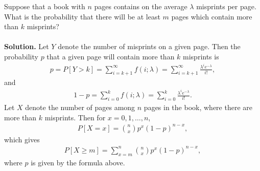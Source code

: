 Suppose that a book with $n$ pages contains on the average $\lambda$ misprints per page. What is the probability that there will be at least $m$ pages which contain more than $k$ misprints? \\
~\\
\textbf{Solution.} Let $Y$ denote the number of misprints on a given page. Then the probability $p$ that a given page will contain more than $k$ misprints is
\begin{align*}
p = P[Y > k] = \sum_{i=k+1}^{\infty} f(i; \lambda) = \sum_{i=k+1}^{\infty} \frac{\lambda^i e^{-\lambda}}{i!},
\end{align*}
and
\begin{align*}
1 - p = \sum_{i=0}^k f(i; \lambda) = \sum_{i=0}^{k} \frac{\lambda^i e^{-\lambda}}{i!}.
\end{align*}
Let $X$ denote the number of pages among $n$ pages in the book, where there are more than $k$ misprints. Then for $x = 0, 1, \ldots, n$,
\begin{align*}
P[X = x] = \binom{n}{x} p^x(1-p)^{n-x},
\end{align*}
which gives
\begin{align*}
P[X\geq m] = \sum_{x=m}^n \binom{n}{x} p^x(1-p)^{n-x},
\end{align*}
where $p$ is given by the formula above.
